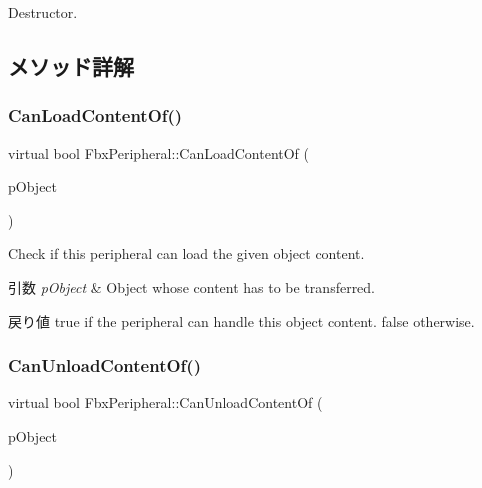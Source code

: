 Destructor. 



\subsection{メソッド詳解}
\mbox{\label{class_fbx_peripheral_a2cd1f044d656a2a8a40d86df3725b496}} 
\subsubsection{\texorpdfstring{Can\+Load\+Content\+Of()}{CanLoadContentOf()}}
{\footnotesize\ttfamily virtual bool Fbx\+Peripheral\+::\+Can\+Load\+Content\+Of (\begin{DoxyParamCaption}\item[{\hyperlink{class_fbx_object}{Fbx\+Object} $\ast$}]{p\+Object }\end{DoxyParamCaption})\hspace{0.3cm}{\ttfamily [pure virtual]}}

Check if this peripheral can load the given object content. 
\begin{DoxyParams}{引数}
{\em p\+Object} & Object whose content has to be transferred. \\
\hline
\end{DoxyParams}
\begin{DoxyReturn}{戻り値}
{\ttfamily true} if the peripheral can handle this object content. {\ttfamily false} otherwise. 
\end{DoxyReturn}
\mbox{\label{class_fbx_peripheral_ac1d217526c6b5de7f621ab7c5151f69e}} 
\subsubsection{\texorpdfstring{Can\+Unload\+Content\+Of()}{CanUnloadContentOf()}}
{\footnotesize\ttfamily virtual bool Fbx\+Peripheral\+::\+Can\+Unload\+Content\+Of (\begin{DoxyParamCaption}\item[{\hyperlink{class_fbx_object}{Fbx\+Object} $\ast$}]{p\+Object }\end{DoxyParamCaption})\hspace{0.3cm}{\ttfamily [pure virtual]}}

